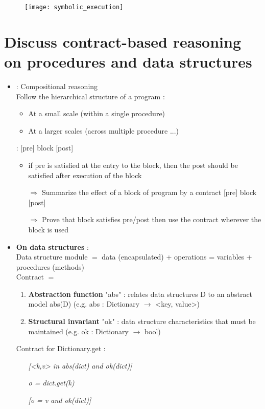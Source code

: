 \begin{figure}[H]
    \centering
    \texttt{[image: symbolic\_execution]}
\end{figure}

\section{Discuss contract-based reasoning on procedures and data structures}

\begin{itemize}
    \item {} : Compositional reasoning\\
    Follow the hierarchical structure of a program :
    \begin{itemize}
        \item At a small scale (within a single procedure)
        \item At a larger scales (across multiple procedure ...)
    \end{itemize}
     : [pre] block [post]
    \begin{itemize}
        \item  if pre is satisfied at the entry to the block, then the post should be satisfied after execution of the block
        \item[$\Rightarrow$] Summarize the effect of a block of program by a contract [pre] block [post]
        \item[$\Rightarrow$] Prove that block satisfies pre/post then use the contract wherever the block is used
    \end{itemize}

    \item \textbf{On data structures} :\\
    Data structure module $=$ data (encapsulated) + operations = variables + procedures (methods)\\
    Contract $=$ 
    \begin{enumerate}
        \item \textbf{Abstraction function} "abs" : relates data structures D to an abstract model abs(D) (e.g. abs : Dictionary $\rightarrow$ {<key, value>})
        \item \textbf{Structural invariant} "ok" : data structure characteristics that must be maintained (e.g. ok : Dictionary $\rightarrow$ bool)
    \end{enumerate}
    Contract for Dictionary.get :
    \begin{itemize}
        \item[] \textit{{[<k,v> in abs(dict) and ok(dict)]}}
        \item[] \textit{o = dict.get(k)}
        \item[] \textit{{[o = v and ok(dict)]}}
    \end{itemize}
\end{itemize}


